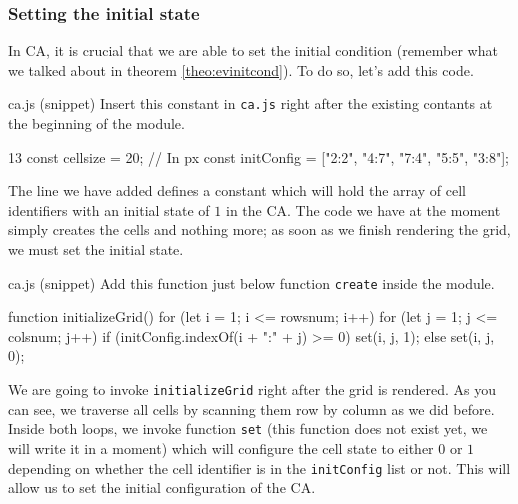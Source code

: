 \subsubsection{Setting the initial state}
In CA, it is crucial that we are able to set the initial condition (remember what we talked about in
theorem \ref{theo:evinitcond}). To do so, let's add this code.

\begin{programcode}{ca.js (snippet)}
Insert this constant in \texttt{ca.js} right after the existing contants at the beginning of the module.
\begin{codeh1}{1}{3}
const cellsize = 20; // In px
const initConfig = ["2:2", "4:7", "7:4", "5:5", "3:8"];
\end{codeh1}
\end{programcode}

The line we have added defines a constant which will hold the array of cell identifiers with an initial state
of $1$ in the CA. The code we have at the moment simply creates the cells and nothing more;
as soon as we finish rendering the grid, we must set the initial state.

\begin{programcode}{ca.js (snippet)}
Add this function just below function \texttt{create} inside the module.
\begin{code}
function initializeGrid() {
  for (let i = 1; i <= rowsnum; i++) {
    for (let j = 1; j <= colsnum; j++) {
      if (initConfig.indexOf(i + ":" + j) >= 0) {
        set(i, j, 1);
      } else {
        set(i, j, 0);
      }
    }
  }
}
\end{code}
\end{programcode}

We are going to invoke \texttt{initializeGrid} right after the grid is rendered. As you can see, we traverse
all cells by scanning them row by column as we did before. Inside both loops, we invoke function \texttt{set}
(this function does not exist yet, we will write it in a moment) which will configure the cell state to either
$0$ or $1$ depending on whether the cell identifier is in the \texttt{initConfig} list or not. This will allow us
to set the initial configuration of the CA.

